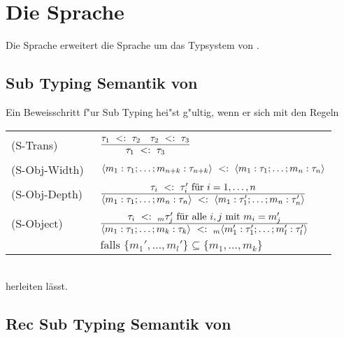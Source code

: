 \section{Die Sprache \LTWOOSUB}
Die Sprache \LTWOOSUB erweitert die Sprache \LTWOSUB um das Typsystem von \LTWOO. 

\subsection{Sub Typing Semantik von \LTWOOSUB}

Ein Beweisschritt f"ur Sub Typing hei"st g"ultig, wenn er sich mit den Regeln  \\[5mm]
  \begin{tabular}{ll}
    \mbox{(S-Trans)\ }      & $\RULE{\subtype{\tau_1} {\tau_2} \quad \subtype{\tau_2} {\tau_3}}
                              {\subtype{\tau_1} {\tau_3}}$ \\[4mm]
    \mbox{(S-Obj-Width)\ }  & $\langle m_1:\tau_1;\ldots;m_{n+k}:\tau_{n+k}\rangle\ <:\ \langle m_1:\tau_1;\ldots;m_n:\tau_n\rangle$ \\[2mm]
    \mbox{(S-Obj-Depth)\ }  & $\RULE{\subtype{\tau_i} {\tau_i'} \text{ f\"ur } i=1,\ldots,n}
                              {\subtype{\typeObject{m_1:\tau_1;\ldots;m_n:\tau_n}}
                               {\typeObject{m_1:\tau_1';\ldots;m_n:\tau_n'}}}$ \\[5mm]
    \mbox{(S-Object)\ }    & $\RULE{\subtype{\tau_i} {_m \tau_j'} \text{ f\"ur alle } i,j \text{ mit } m_i = m_j'}
                              {\subtype{\typeObject{m_1:\tau_1;\ldots;m_k:\tau_k}}
                               {_m \typeObject{m_1':\tau_1';\ldots;m_l':\tau_l'}}}$ \\[4mm]
                      & $\text{falls } \{m_1',\ldots,m_l'\} \subseteq \{m_1,\ldots,m_k\}$
  \end{tabular} \\[7mm]

herleiten l\"asst.

\subsection{Rec Sub Typing Semantik von \LTWOOSUB} 

